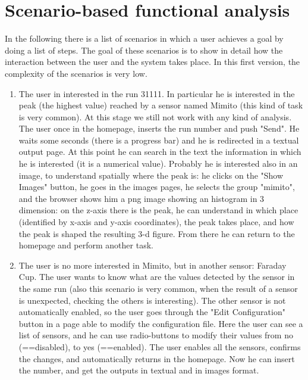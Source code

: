 \section{Scenario-based functional analysis}

In the following there is a list of scenarios in which a user achieves a goal by doing a list of steps. The goal of these scenarios is to show in detail how the interaction between the user and the system takes place. In this first version, the complexity of the scenarios is very low. 

\begin{enumerate}

\item The user in interested in the run 31111. In particular he is interested in the peak (the highest value) reached by a sensor named Mimito (this kind of task is very common). At this stage we still not work with any kind of analysis. The user once in the homepage, inserts the run number and push "Send". He waits some seconds (there is a progress bar) and he is redirected in a textual output page. At this point he can search in the text the information in which he is interested (it is a numerical value). Probably he is interested also in an image, to understand spatially where the peak is: he clicks on the "Show Images" button, he goes in the images pages, he selects the group "mimito", and the browser shows him a png image showing an histogram in 3 dimension: on the z-axis there is the peak, he can understand in which place (identified by x-axis and y-axis coordinates), the peak takes place, and how the peak is shaped the resulting 3-d figure. From there he can return to the homepage and perform another task.   

\item The user is no more interested in Mimito, but in another sensor: Faraday Cup. The user wants to know what are the values detected by the sensor in the same run (also this scenario is very common, when the result of a sensor is unexpected, checking the others is interesting). The other sensor is not automatically enabled, so the user goes through the "Edit Configuration" button in a page able to modify the configuration file. Here the user can see a list of sensors, and he can use radio-buttons to modify their values from no (==disabled), to yes (==enabled). The user enables all the sensors, confirms the changes, and automatically returns in the homepage. Now he can insert the number, and get the outputs in textual and in images format.  



\end{enumerate}


